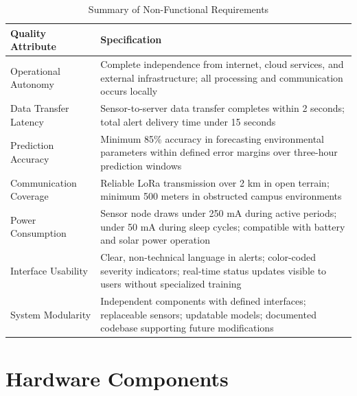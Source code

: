 \begin{table}[H]
\centering
\caption{Summary of Non-Functional Requirements}
\label{tab:nonfunctional_requirements}
\begin{tabular}{|p{4.5cm}|p{10cm}|}
\hline
\textbf{Quality Attribute} & \textbf{Specification} \\
\hline
Operational Autonomy & Complete independence from internet, cloud services, and external infrastructure; all processing and communication occurs locally \\
\hline
Data Transfer Latency & Sensor-to-server data transfer completes within 2 seconds; total alert delivery time under 15 seconds \\
\hline
Prediction Accuracy & Minimum 85\% accuracy in forecasting environmental parameters within defined error margins over three-hour prediction windows \\
\hline
Communication Coverage & Reliable LoRa transmission over 2 km in open terrain; minimum 500 meters in obstructed campus environments \\
\hline
Power Consumption & Sensor node draws under 250 mA during active periods; under 50 mA during sleep cycles; compatible with battery and solar power operation \\
\hline
Interface Usability & Clear, non-technical language in alerts; color-coded severity indicators; real-time status updates visible to users without specialized training \\
\hline
System Modularity & Independent components with defined interfaces; replaceable sensors; updatable models; documented codebase supporting future modifications \\
\hline
\end{tabular}
\end{table}

\section{Hardware Components}

